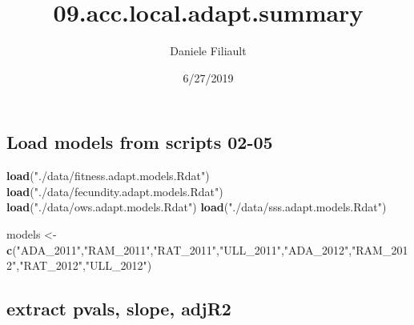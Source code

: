 \documentclass[]{article}
\title{09.acc.local.adapt.summary}
\author{Daniele Filiault}
\date{6/27/2019}
\newenvironment{Shaded}{\begin{snugshade}}{\end{snugshade}}
\newcommand{\KeywordTok}[1]{\textcolor[rgb]{0.13,0.29,0.53}{\textbf{#1}}}
\newcommand{\StringTok}[1]{\textcolor[rgb]{0.31,0.60,0.02}{#1}}
\newcommand{\NormalTok}[1]{#1}
\begin{document}
\maketitle

\subsection{Load models from scripts
02-05}\label{load-models-from-scripts-02-05}

\begin{Shaded}
\begin{Highlighting}[]
\KeywordTok{load}\NormalTok{(}\StringTok{"./data/fitness.adapt.models.Rdat"}\NormalTok{)}
\KeywordTok{load}\NormalTok{(}\StringTok{"./data/fecundity.adapt.models.Rdat"}\NormalTok{)}
\KeywordTok{load}\NormalTok{(}\StringTok{"./data/ows.adapt.models.Rdat"}\NormalTok{)}
\KeywordTok{load}\NormalTok{(}\StringTok{"./data/sss.adapt.models.Rdat"}\NormalTok{)}

\NormalTok{models <-}\StringTok{ }\KeywordTok{c}\NormalTok{(}\StringTok{"ADA_2011"}\NormalTok{,}\StringTok{"RAM_2011"}\NormalTok{,}\StringTok{"RAT_2011"}\NormalTok{,}\StringTok{"ULL_2011"}\NormalTok{,}\StringTok{"ADA_2012"}\NormalTok{,}\StringTok{"RAM_2012"}\NormalTok{,}\StringTok{"RAT_2012"}\NormalTok{,}\StringTok{"ULL_2012"}\NormalTok{)}
\end{Highlighting}
\end{Shaded}

\subsection{extract pvals, slope,
adjR2}\label{extract-pvals-slope-adjr2}
\end{document}
